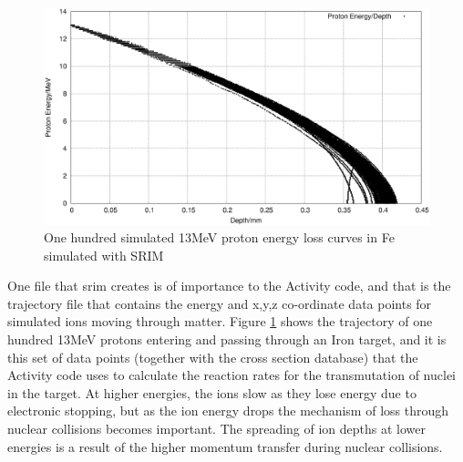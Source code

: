 \begin{figure}
  \begin{center}
    \includegraphics[width=.7\linewidth]{chapters/isotope_activation_and_radioactive_decay/plots/fe_13MeV.eps}
    \caption{One hundred simulated 13MeV proton energy loss curves in Fe simulated with SRIM \cite{srim}}
    \label{fig:fe13traj}
  \end{center}
\end{figure}

One file that \acrshort{srim} creates is of importance to the Activity code, and that is the trajectory file that contains the energy and x,y,z co-ordinate data points for simulated ions moving through matter.  Figure \ref{fig:fe13traj} shows the trajectory of one hundred 13MeV protons entering and passing through an Iron target, and it is this set of data points (together with the cross section database) that the Activity code uses to calculate the reaction rates for the transmutation of nuclei in the target.  At higher energies, the ions slow as they lose energy due to electronic stopping, but as the ion energy drops the mechanism of loss through nuclear collisions becomes important.  The spreading of ion depths at lower energies is a result of the higher momentum transfer during nuclear collisions.









